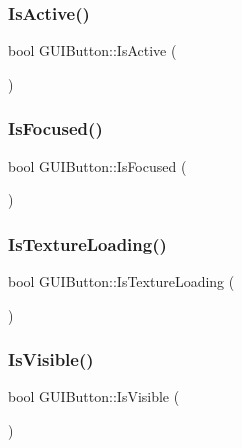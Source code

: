 \subsubsection{\texorpdfstring{Is\+Active()}{IsActive()}}
{\footnotesize\ttfamily bool G\+U\+I\+Button\+::\+Is\+Active (\begin{DoxyParamCaption}{ }\end{DoxyParamCaption})}

\hypertarget{class_g_u_i_button_a4e2b5b33106174e1ea235535d62e4809}{}\label{class_g_u_i_button_a4e2b5b33106174e1ea235535d62e4809} 
\subsubsection{\texorpdfstring{Is\+Focused()}{IsFocused()}}
{\footnotesize\ttfamily bool G\+U\+I\+Button\+::\+Is\+Focused (\begin{DoxyParamCaption}{ }\end{DoxyParamCaption})}

\hypertarget{class_g_u_i_button_af72bdddbbfb521fdc41ce8afd61795a5}{}\label{class_g_u_i_button_af72bdddbbfb521fdc41ce8afd61795a5} 
\subsubsection{\texorpdfstring{Is\+Texture\+Loading()}{IsTextureLoading()}}
{\footnotesize\ttfamily bool G\+U\+I\+Button\+::\+Is\+Texture\+Loading (\begin{DoxyParamCaption}{ }\end{DoxyParamCaption})}

\hypertarget{class_g_u_i_button_aaad932d78dd25b83b9951bda17c77e39}{}\label{class_g_u_i_button_aaad932d78dd25b83b9951bda17c77e39} 
\subsubsection{\texorpdfstring{Is\+Visible()}{IsVisible()}}
{\footnotesize\ttfamily bool G\+U\+I\+Button\+::\+Is\+Visible (\begin{DoxyParamCaption}{ }\end{DoxyParamCaption})}

